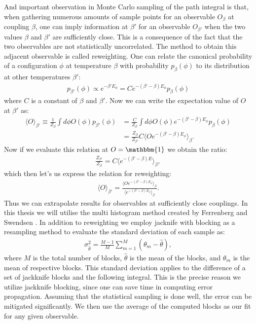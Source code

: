 \documentclass[english,twoside,openright]{UH_TCM_MSc}
\newcommand{\id}{\mathbbm{1}}
\begin{document}
And important observation in Monte Carlo sampling of the path integral is that, when gathering numerous amounts of sample points for an observable $O_\beta$ at coupling $\beta$, one can imply information at $\beta'$ for an observable $O_{\beta'}$ when the two values $\beta$ and $\beta'$ are sufficiently close. This is a consequence of the fact that the two observables are not statistically uncorrelated. The method to obtain this adjacent observable is called reweighting. One can relate the canonical probability of a configuration $\phi$ at temperature $\beta$ with probability $p_\beta(\phi)$ to its distribution at other temperatures $\beta'$:
\begin{align}
    p_{\beta'}(\phi) \propto e^{-\beta' E_\phi} = Ce^{-(\beta' - \beta)E_\phi} p_\beta(\phi)
\end{align}
where $C$ is a constant of $\beta$ and $\beta'$. Now we can write the expectation value of $O$ at $\beta'$ as:
\begin{align}
    \langle O \rangle_{\beta'} \equiv \frac{1}{Z_\beta}\int d\phi O(\phi) p_{\beta'}(\phi) &=  \frac{C}{Z_\beta}\int d\phi O(\phi) e^{-(\beta' - \beta)E_\phi} p_\beta(\phi) \\
    &= \frac{Z_\beta}{Z_{\beta'}}C\langle O e^{-(\beta'-\beta)E_\phi}\rangle_\beta.
\end{align}
Now if we evaluate this relation at $O=\id$ we obtain the ratio:
\begin{align}
    \frac{Z_{\beta'}}{Z_\beta} = C\langle  e^{-(\beta'-\beta)E}\rangle_\beta,
\end{align}
which then let's us express the relation for reweighting:
\begin{align}
     \langle O \rangle_{\beta'} = \frac{\langle O e^{-(\beta'-\beta)E_\phi}\rangle_\beta}{\langle  e^{-(\beta'-\beta)E_\phi}\rangle_\beta}.
\end{align}
Thus we can extrapolate results for observables at sufficiently close couplings. In this thesis we will utilise the multi histogram method created by Ferrenberg and Swendsen \cite{FS-reweight}. In addition to reweighting we employ jacknife with blocking \cite[ch. 4.5.3]{gattringer2009quantum} as a resampling method to evaluate the standard deviation of each sample as:
\begin{align}
    \sigma^2_{\hat\theta} = \frac{M-1}{M}\sum_{m=1}^M(\theta_m - \hat\theta), \label{eq:error}
\end{align}
where $M$ is the total number of blocks, $\hat\theta$ is the mean of the blocks, and $\theta_m$ is the mean of respective blocks. This standard deviation applies to the difference of a set of jackknife blocks and the following integral. This is the precise reason we utilize jackknife blocking, since one can save time in computing error propagation. Assuming that the statistical sampling is done well, the error can be mitigated significantly. We then use the average of the computed blocks as our fit for any given observable. 
\end{document}
